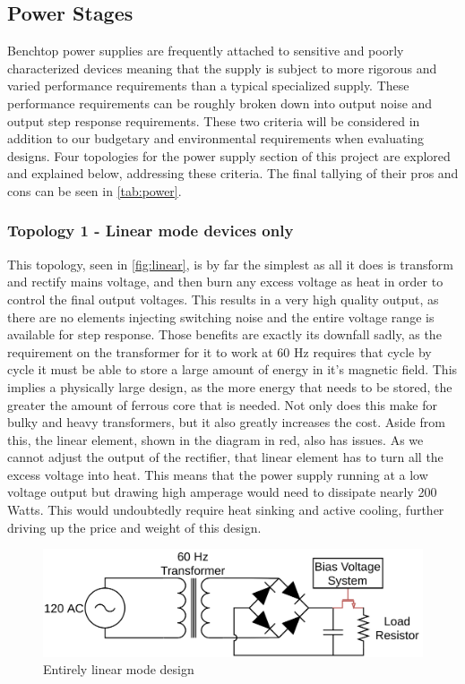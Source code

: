 \documentclass[12pt]{article}
\begin{document}
\subsection{Power Stages}
Benchtop power supplies are frequently attached to sensitive and poorly 
characterized devices meaning that the supply is subject to more rigorous 
and varied performance requirements than a typical specialized supply. 
These performance requirements can be roughly broken down into output noise 
and output step response requirements. These two criteria will be considered 
in addition to our budgetary and environmental requirements when evaluating 
designs. Four topologies for the power supply section of this project are 
explored and explained below, addressing these criteria. The final tallying 
of their pros and cons can be seen in \autoref{tab:power}.

\subsubsection{Topology 1 - Linear mode devices only}
This topology, seen in \autoref{fig:linear}, is by far the simplest as all it does is transform and rectify mains 
voltage, and then burn any excess voltage as heat in order to control the final 
output voltages. This results in a very high quality output, as there are no elements 
injecting switching noise and the entire voltage range is available for step response. 
Those benefits are exactly its downfall sadly, as the requirement on the transformer 
for it to work at 60 Hz requires that cycle by cycle it must be able to store a 
large amount of energy in it's magnetic field. This implies a physically large design, as 
the more energy that needs to be stored, the greater the amount of ferrous core that is needed. 
Not only does this make for bulky and heavy transformers, but it also greatly increases 
the cost. Aside from this, the linear element, shown in the diagram in red, also has issues. As we cannot adjust the output of the rectifier, that linear element has to 
turn all the excess voltage into heat. This means that the power supply running at 
a low voltage output but drawing high amperage would need to dissipate nearly 200 
Watts. This would undoubtedly require heat sinking and active cooling, further driving up 
the price and weight of this design.

\begin{figure}[H]
    \includegraphics[width=\textwidth]{linear}
    \caption{Entirely linear mode design}
    \label{fig:linear}
\end{figure}
\end{document}
